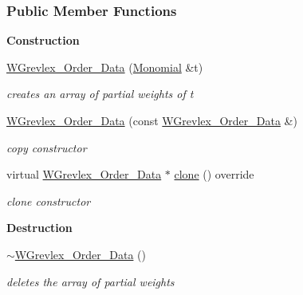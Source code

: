 \subsubsection*{Public Member Functions}
\begin{Indent}\textbf{ Construction}\par
\begin{DoxyCompactItemize}
\item 
\hyperlink{group__orderinggroup_ad81bc55e04131b2d23371f6ce71d0422}{W\+Grevlex\+\_\+\+Order\+\_\+\+Data} (\hyperlink{group__polygroup_class_monomial}{Monomial} \&t)
\begin{DoxyCompactList}\small\item\em creates an array of partial weights of {\ttfamily t} \end{DoxyCompactList}\item 
\mbox{\label{group__orderinggroup_a6074df104102f245666d996d100a859c}} 
\hyperlink{group__orderinggroup_a6074df104102f245666d996d100a859c}{W\+Grevlex\+\_\+\+Order\+\_\+\+Data} (const \hyperlink{group__orderinggroup_class_w_grevlex___order___data}{W\+Grevlex\+\_\+\+Order\+\_\+\+Data} \&)
\begin{DoxyCompactList}\small\item\em copy constructor \end{DoxyCompactList}\item 
\mbox{\label{group__orderinggroup_a84cb6a2eb475dc0bb4d7b2d7f21fa033}} 
virtual \hyperlink{group__orderinggroup_class_w_grevlex___order___data}{W\+Grevlex\+\_\+\+Order\+\_\+\+Data} $\ast$ \hyperlink{group__orderinggroup_a84cb6a2eb475dc0bb4d7b2d7f21fa033}{clone} () override
\begin{DoxyCompactList}\small\item\em clone constructor \end{DoxyCompactList}\end{DoxyCompactItemize}
\end{Indent}
\begin{Indent}\textbf{ Destruction}\par
\begin{DoxyCompactItemize}
\item 
\mbox{\label{group__orderinggroup_aad8299f5ca80ad008cd62ba9e802abae}} 
\hyperlink{group__orderinggroup_aad8299f5ca80ad008cd62ba9e802abae}{$\sim$\+W\+Grevlex\+\_\+\+Order\+\_\+\+Data} ()
\begin{DoxyCompactList}\small\item\em deletes the array of partial weights \end{DoxyCompactList}\end{DoxyCompactItemize}
\end{Indent}
